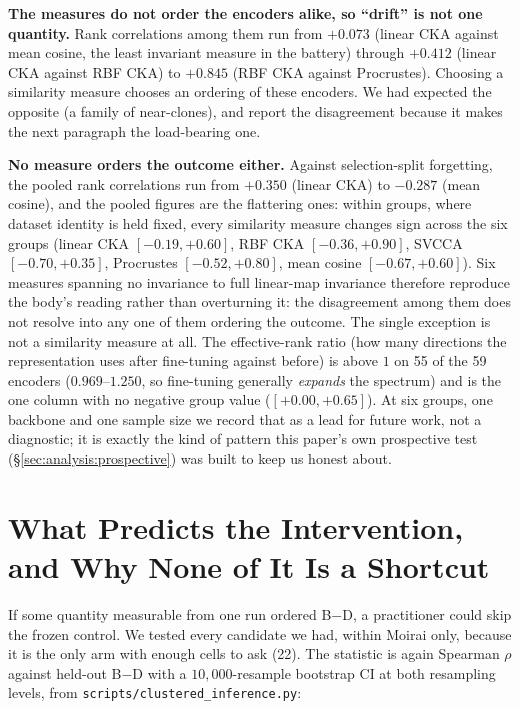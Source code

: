 \textbf{The measures do not order the encoders alike, so ``drift'' is not one
quantity.} Rank correlations among them run from $+0.073$ (linear CKA against
mean cosine, the least invariant measure in the battery) through $+0.412$ (linear
CKA against RBF CKA) to $+0.845$ (RBF CKA against Procrustes). Choosing a
similarity measure chooses an ordering of these encoders. We had expected the
opposite (a family of near-clones), and report the disagreement because it makes
the next paragraph the load-bearing one.

\textbf{No measure orders the outcome either.} Against selection-split
forgetting, the pooled rank correlations run from $+0.350$ (linear CKA) to
$-0.287$ (mean cosine), and the pooled figures are the flattering ones: within
groups, where dataset identity is held fixed, every similarity measure changes
sign across the six groups (linear CKA $[-0.19,{+}0.60]$, RBF CKA
$[-0.36,{+}0.90]$, SVCCA $[-0.70,{+}0.35]$, Procrustes $[-0.52,{+}0.80]$, mean
cosine $[-0.67,{+}0.60]$). Six measures spanning no invariance to full
linear-map invariance therefore reproduce the body's reading rather than
overturning it: the disagreement among them does not resolve into any one of them
ordering the outcome. The single exception is not a similarity measure at all.
The effective-rank ratio (how many directions the representation uses after
fine-tuning against before) is above $1$ on 55 of the 59 encoders
($0.969$--$1.250$, so fine-tuning generally \emph{expands} the spectrum) and is
the one column with no negative group value ($[+0.00,{+}0.65]$). At six groups,
one backbone and one sample size we record that as a lead for future work, not a
diagnostic; it is exactly the kind of pattern this paper's own prospective test
(\S\ref{sec:analysis:prospective}) was built to keep us honest about.

\section{What Predicts the Intervention, and Why None of It Is a Shortcut}
\label{app:predictor}

If some quantity measurable from one run ordered B$-$D, a practitioner could
skip the frozen control. We tested every candidate we had, within Moirai only,
because it is the only arm with enough cells to ask (22). The statistic is again
Spearman $\rho$ against held-out B$-$D with a $10{,}000$-resample bootstrap CI at
both resampling levels, from \texttt{scripts/clustered\_inference.py}:

